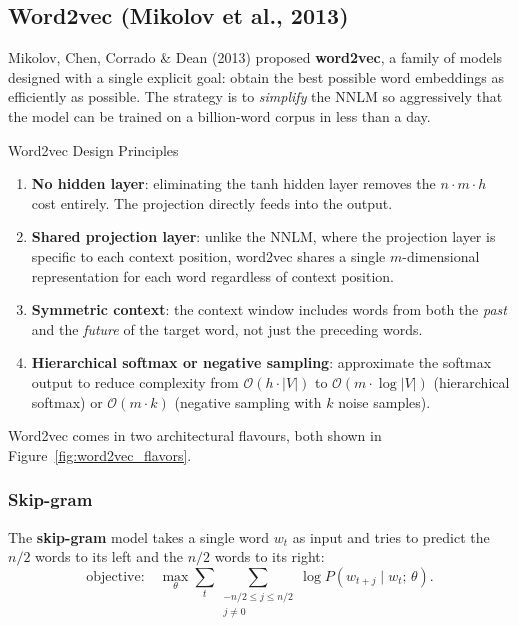 \documentclass[11pt,a4paper]{article}
\newcommand{\term}[1]{\textcolor{DefGreen}{\textbf{#1}}\index{#1}}
\begin{document}
\subsection{Word2vec (Mikolov et al., 2013)}
\label{sec:word2vec}

Mikolov, Chen, Corrado \& Dean (2013) proposed \term{word2vec}, a family of models designed with a single explicit goal: obtain the best possible word embeddings as efficiently as possible. The strategy is to \emph{simplify} the NNLM so aggressively that the model can be trained on a billion-word corpus in less than a day.

\begin{thmbox}{Word2vec Design Principles}
\begin{enumerate}
  \item \textbf{No hidden layer}: eliminating the tanh hidden layer removes the $n \cdot m \cdot h$ cost entirely. The projection directly feeds into the output.
  \item \textbf{Shared projection layer}: unlike the NNLM, where the projection layer is specific to each context position, word2vec shares a single $m$-dimensional representation for each word regardless of context position.
  \item \textbf{Symmetric context}: the context window includes words from both the \emph{past} and the \emph{future} of the target word, not just the preceding words.
  \item \textbf{Hierarchical softmax or negative sampling}: approximate the softmax output to reduce complexity from $\mathcal{O}(h \cdot |V|)$ to $\mathcal{O}(m \cdot \log|V|)$ (hierarchical softmax) or $\mathcal{O}(m \cdot k)$ (negative sampling with $k$ noise samples).
\end{enumerate}
\end{thmbox}

Word2vec comes in two architectural flavours, both shown in Figure~\ref{fig:word2vec_flavors}.

\subsubsection{Skip-gram}

The \term{skip-gram} model takes a single word $w_t$ as input and tries to predict the $n/2$ words to its left and the $n/2$ words to its right:
\[
  \text{objective:} \quad \max_\theta \sum_{t} \sum_{\substack{-n/2 \leq j \leq n/2 \\ j \neq 0}} \log P(w_{t+j} \mid w_t;\, \theta).
\]
\end{document}
